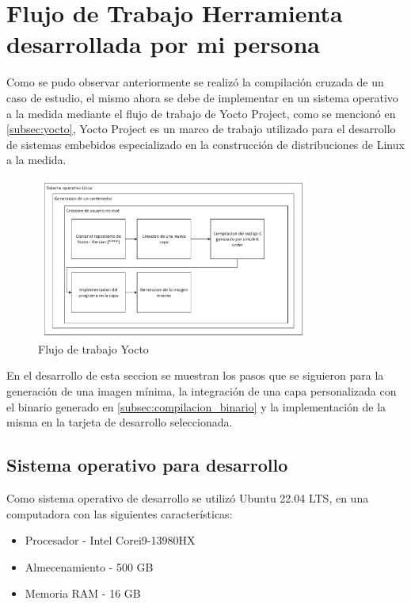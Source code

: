 \section{Flujo de Trabajo Herramienta desarrollada por mi persona}

Como se pudo observar anteriormente se realizó la compilación cruzada de un caso de estudio, el mismo ahora se debe de implementar en un sistema operativo a la medida mediante el flujo de trabajo de Yocto Project, como se mencionó en \ref{subsec:yocto}, Yocto Project es un marco de trabajo utilizado para el desarrollo de sistemas embebidos especializado en la construcción de distribuciones de Linux a la medida. 

\begin{figure}[h!]
    \centering
    \includegraphics[width=0.8\textwidth]{fig/especifico_2/Flujo de trabajo de mi idea.pdf}
    \caption{Flujo de trabajo Yocto}
    \label{fig:flujo_yocto}
\end{figure}

En el desarrollo de esta seccion se muestran los pasos que se siguieron para la generación de una imagen mínima, la integración de una capa personalizada con el binario generado en \ref{subsec:compilacion_binario} y la implementación de la misma en la tarjeta de desarrollo seleccionada.

\subsection{Sistema operativo para desarrollo}

Como sistema operativo de desarrollo se utilizó Ubuntu 22.04 LTS, en una computadora con las siguientes características:

\begin{itemize}
    \item Procesador - Intel Corei9-13980HX 
    \item Almecenamiento - 500 GB
    \item Memoria RAM - 16 GB 
\end{itemize}

